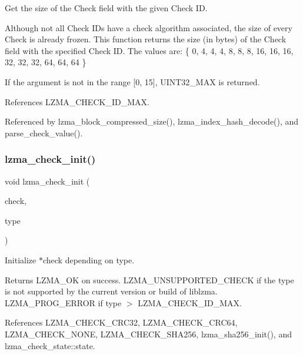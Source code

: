Get the size of the Check field with the given Check ID. 

Although not all Check I\+Ds have a check algorithm associated, the size of every Check is already frozen. This function returns the size (in bytes) of the Check field with the specified Check ID. The values are\+: \{ 0, 4, 4, 4, 8, 8, 8, 16, 16, 16, 32, 32, 32, 64, 64, 64 \}

If the argument is not in the range [0, 15], U\+I\+N\+T32\+\_\+\+M\+AX is returned. 

References L\+Z\+M\+A\+\_\+\+C\+H\+E\+C\+K\+\_\+\+I\+D\+\_\+\+M\+AX.



Referenced by lzma\+\_\+block\+\_\+compressed\+\_\+size(), lzma\+\_\+index\+\_\+hash\+\_\+decode(), and parse\+\_\+check\+\_\+value().

\mbox{\label{check_8c_aeb14796081bbe051ca7a08952c7383e8}} 
\subsubsection{lzma\+\_\+check\+\_\+init()}
{\footnotesize\ttfamily void lzma\+\_\+check\+\_\+init (\begin{DoxyParamCaption}\item[{\textbf{ lzma\+\_\+check\+\_\+state} $\ast$}]{check,  }\item[{\textbf{ lzma\+\_\+check}}]{type }\end{DoxyParamCaption})}



Initialize $\ast$check depending on type. 

\begin{DoxyReturn}{Returns}
L\+Z\+M\+A\+\_\+\+OK on success. L\+Z\+M\+A\+\_\+\+U\+N\+S\+U\+P\+P\+O\+R\+T\+E\+D\+\_\+\+C\+H\+E\+CK if the type is not supported by the current version or build of liblzma. L\+Z\+M\+A\+\_\+\+P\+R\+O\+G\+\_\+\+E\+R\+R\+OR if type $>$ L\+Z\+M\+A\+\_\+\+C\+H\+E\+C\+K\+\_\+\+I\+D\+\_\+\+M\+AX. 
\end{DoxyReturn}


References L\+Z\+M\+A\+\_\+\+C\+H\+E\+C\+K\+\_\+\+C\+R\+C32, L\+Z\+M\+A\+\_\+\+C\+H\+E\+C\+K\+\_\+\+C\+R\+C64, L\+Z\+M\+A\+\_\+\+C\+H\+E\+C\+K\+\_\+\+N\+O\+NE, L\+Z\+M\+A\+\_\+\+C\+H\+E\+C\+K\+\_\+\+S\+H\+A256, lzma\+\_\+sha256\+\_\+init(), and lzma\+\_\+check\+\_\+state\+::state.

